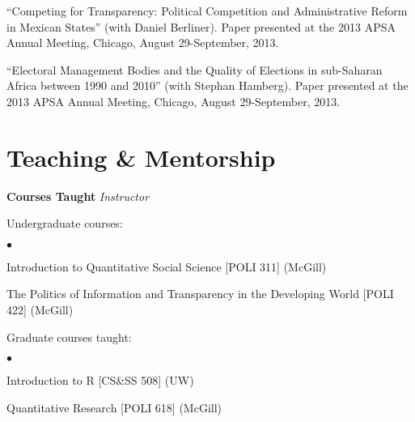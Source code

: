 \documentclass[margin,line]{res}
\newenvironment{list1}{
  \begin{list}{\ding{113}}{%
      \setlength{\itemsep}{0in}
      \setlength{\parsep}{0in} \setlength{\parskip}{0in}
      \setlength{\topsep}{0in} \setlength{\partopsep}{0in} 
      \setlength{\leftmargin}{0.17in}}}{\end{list}}
\newenvironment{list2}{
  \begin{list}{$\bullet$}{%
      \setlength{\itemsep}{0in}
      \setlength{\parsep}{0in} \setlength{\parskip}{0in}
      \setlength{\topsep}{0in} \setlength{\partopsep}{0in} 
      \setlength{\leftmargin}{0.2in}}}{\end{list}}
\begin{document}
{\begin{resume}
``Competing for Transparency: Political Competition and Administrative
Reform in Mexican States'' (with Daniel Berliner). Paper presented at
the 2013 APSA Annual Meeting, Chicago, August 29-September, 2013.

``Electoral Management Bodies and the Quality of Elections in
 sub-Saharan Africa between 1990 and 2010'' (with Stephan Hamberg).
Paper presented at
the 2013 APSA Annual Meeting, Chicago, August 29-September, 2013.


\section{\sc Teaching \& Mentorship}
\textbf{Courses Taught}
{\em Instructor}\\
\vspace{-.1in}
\begin{list1}
\item[] Undergraduate courses:
   \begin{list2}
   \item[] Introduction to Quantitative Social Science [POLI 311]
     (McGill)
   \item[] The Politics of Information and Transparency in the
     Developing World [POLI 422] (McGill)
\end{list2}

 \item[] Graduate courses taught:
   \begin{list2}
   \item[] Introduction to R  [CS\&SS 508] (UW)
   \item[] Quantitative Research [POLI 618] (McGill)
\end{list2}
\end{list1}


\end{resume}}
\end{document}
